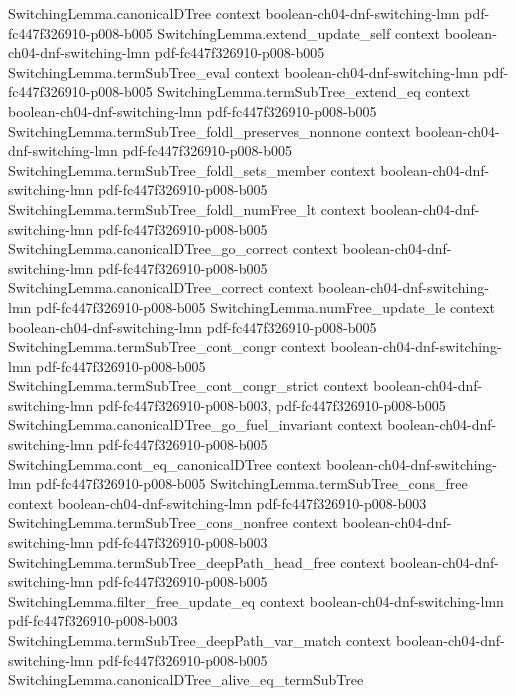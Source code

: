 \begin{lemma}
\proofstep
  {SwitchingLemma.canonicalDTree}
  {context}
  {boolean-ch04-dnf-switching-lmn}
  {pdf-fc447f326910-p008-b005}
\proofstep
  {SwitchingLemma.extend_update_self}
  {context}
  {boolean-ch04-dnf-switching-lmn}
  {pdf-fc447f326910-p008-b005}
\proofstep
  {SwitchingLemma.termSubTree_eval}
  {context}
  {boolean-ch04-dnf-switching-lmn}
  {pdf-fc447f326910-p008-b005}
\proofstep
  {SwitchingLemma.termSubTree_extend_eq}
  {context}
  {boolean-ch04-dnf-switching-lmn}
  {pdf-fc447f326910-p008-b005}
\proofstep
  {SwitchingLemma.termSubTree_foldl_preserves_nonnone}
  {context}
  {boolean-ch04-dnf-switching-lmn}
  {pdf-fc447f326910-p008-b005}
\proofstep
  {SwitchingLemma.termSubTree_foldl_sets_member}
  {context}
  {boolean-ch04-dnf-switching-lmn}
  {pdf-fc447f326910-p008-b005}
\proofstep
  {SwitchingLemma.termSubTree_foldl_numFree_lt}
  {context}
  {boolean-ch04-dnf-switching-lmn}
  {pdf-fc447f326910-p008-b005}
\proofstep
  {SwitchingLemma.canonicalDTree_go_correct}
  {context}
  {boolean-ch04-dnf-switching-lmn}
  {pdf-fc447f326910-p008-b005}
\proofstep
  {SwitchingLemma.canonicalDTree_correct}
  {context}
  {boolean-ch04-dnf-switching-lmn}
  {pdf-fc447f326910-p008-b005}
\proofstep
  {SwitchingLemma.numFree_update_le}
  {context}
  {boolean-ch04-dnf-switching-lmn}
  {pdf-fc447f326910-p008-b005}
\proofstep
  {SwitchingLemma.termSubTree_cont_congr}
  {context}
  {boolean-ch04-dnf-switching-lmn}
  {pdf-fc447f326910-p008-b005}
\proofstep
  {SwitchingLemma.termSubTree_cont_congr_strict}
  {context}
  {boolean-ch04-dnf-switching-lmn}
  {pdf-fc447f326910-p008-b003,
    pdf-fc447f326910-p008-b005}
\proofstep
  {SwitchingLemma.canonicalDTree_go_fuel_invariant}
  {context}
  {boolean-ch04-dnf-switching-lmn}
  {pdf-fc447f326910-p008-b005}
\proofstep
  {SwitchingLemma.cont_eq_canonicalDTree}
  {context}
  {boolean-ch04-dnf-switching-lmn}
  {pdf-fc447f326910-p008-b005}
\proofstep
  {SwitchingLemma.termSubTree_cons_free}
  {context}
  {boolean-ch04-dnf-switching-lmn}
  {pdf-fc447f326910-p008-b003}
\proofstep
  {SwitchingLemma.termSubTree_cons_nonfree}
  {context}
  {boolean-ch04-dnf-switching-lmn}
  {pdf-fc447f326910-p008-b003}
\proofstep
  {SwitchingLemma.termSubTree_deepPath_head_free}
  {context}
  {boolean-ch04-dnf-switching-lmn}
  {pdf-fc447f326910-p008-b005}
\proofstep
  {SwitchingLemma.filter_free_update_eq}
  {context}
  {boolean-ch04-dnf-switching-lmn}
  {pdf-fc447f326910-p008-b003}
\proofstep
  {SwitchingLemma.termSubTree_deepPath_var_match}
  {context}
  {boolean-ch04-dnf-switching-lmn}
  {pdf-fc447f326910-p008-b005}
\proofstep
  {SwitchingLemma.canonicalDTree_alive_eq_termSubTree}

\end{lemma}

